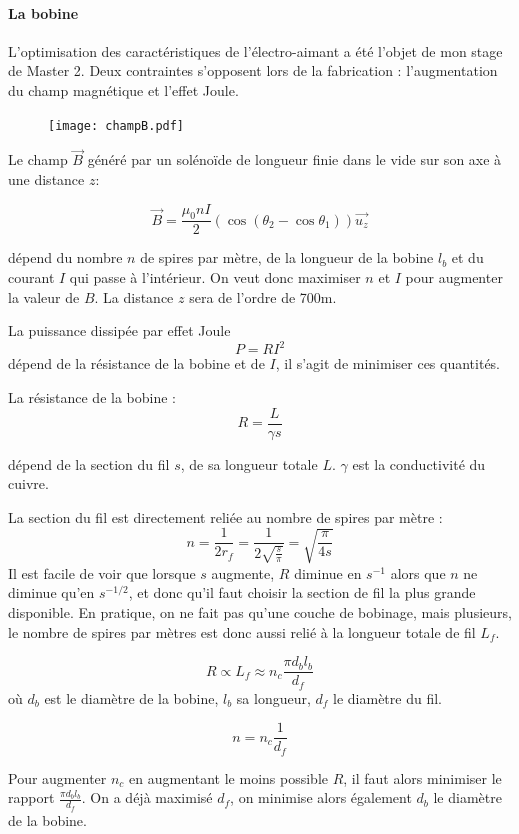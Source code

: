 \paragraph{La bobine}

	L'optimisation des caractéristiques de l'électro-aimant a été l'objet de mon stage de Master 2. 
	Deux contraintes s'opposent lors de la fabrication : l'augmentation du champ magnétique et l'effet Joule. 
	
	\begin{figure}
	\texttt{[image: champB.pdf]}
	\end{figure}
	Le champ $\vec{B}$ généré par un solénoïde de longueur finie dans le vide sur son axe à une distance $z$:
		
		$$ \vec{B} = \frac{\mu_0 n I}{2} \left(\cos \left(\theta_2 -\cos \theta_1 \right)\right) \vec{u_z}$$
		
		dépend du nombre $n$ de spires par mètre, de la longueur de la bobine $l_b$ et du courant $I$ qui passe à l'intérieur. On veut donc maximiser $n$ et $I$ pour augmenter la valeur de $B$. La distance $z$ sera de l'ordre de 700\micro m. 
		
		La puissance dissipée par effet Joule $$P = R I^2$$ dépend de la résistance de la bobine et de $I$, il s'agit de minimiser ces quantités.
		
		La résistance de la bobine : $$R = \frac{L}{\gamma s}$$
		
		dépend de la section du fil $s$, de sa longueur totale $L$. $\gamma$ est la conductivité du cuivre.  
		
		La section du fil est directement reliée au nombre de spires par mètre : $$ n = \frac{1}{2r_f} = \frac{1}{2 \sqrt{\frac{s}{\pi}}} = \sqrt{\frac{\pi}{4s}}$$  Il est facile de voir que lorsque $s$ augmente, $R$ diminue en $s^{-1}$ alors que $n$ ne diminue qu'en $s^{-1/2}$, et donc qu'il faut choisir la section de fil la plus grande disponible.
		En pratique, on ne fait pas qu'une couche de bobinage, mais plusieurs, le nombre de spires par mètres est donc aussi relié à la longueur totale de fil $L_f$.
		
		$$R \propto L_f \approx n_c \frac{\pi d_b l_b}{d_f}$$ où $d_b$ est le diamètre de la bobine, $l_b$ sa longueur, $d_f$ le diamètre du fil. 
		
		$$n = n_c \frac{1}{d_f}$$
		
		Pour augmenter $n_c$ en augmentant le moins possible $R$, il faut alors minimiser le rapport $\frac{\pi d_b l_b}{d_f}$. On a déjà maximisé $d_f$, on minimise alors également $d_b$ le diamètre de la bobine.
		
